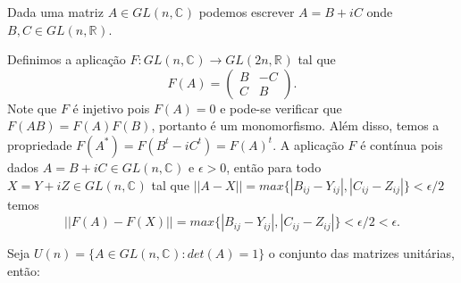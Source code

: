 \documentclass[12pt]{book}
\newcommand{\complexo}[1]{\mathbb{C}^{#1}}
\newcommand{\generalgroup}[2]{GL(#1, #2)}
\newcommand{\generalgroupreal}[1]{\generalgroup{#1}{\real{}}}
\newcommand{\generalgroupcomplexo}[1]{\generalgroup{#1}{\complexo{}}}
\newcommand{\matrizunitaria}[1]{U(#1)}
\newcommand{\real}[1]{\mathbb{R}^{#1}}
\begin{document}
	Dada uma matriz $A \in \generalgroupcomplexo{n}$ podemos escrever $A = B+iC$ onde $B,C \in \generalgroupreal{n}$. 
	
	Definimos a aplicação $F:\generalgroupcomplexo{n} \to \generalgroupreal{2n}$ tal que 
	$$
	F(A)=
	\left(
	\begin{array}{cc}
	B & -C
	\\
	C & B
	\end{array}
	\right).
	$$
	Note que $F$ é injetivo pois $F(A) = 0$ e pode-se verificar que $F(AB)=F(A)F(B)$, portanto é um monomorfismo. Além disso, temos a propriedade $F(A^{*}) = F(B^{t} - iC^{t}) = F(A)^{t}$. A aplicação $F$ é contínua pois dados $A=B+iC \in \generalgroupcomplexo{n}$ e $\epsilon > 0$, então para todo $X= Y+iZ \in \generalgroupcomplexo{n}$ tal que $||A - X||=max \{|B_{ij} - Y_{ij}|,  |C_{ij} - Z_{ij}|\} < \epsilon/2$ temos
	$$
	||F(A) - F(X)|| = max \{|B_{ij} - Y_{ij}|, |C_{ij} - Z_{ij}| \}< \epsilon/2 < \epsilon.
	$$

	Seja $\matrizunitaria{n} = \{A\in \generalgroupcomplexo{n}: det(A)=1 \}$ o conjunto das matrizes unitárias, então:
	
\end{document}
